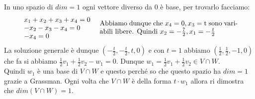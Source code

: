 \begin{example}
In uno spazio di $dim = 1$ ogni vettore diverso da 0 è base, per trovarlo facciamo:\\
\[\begin{array}{l}
    x_1 + x_2 + x_3 + x_4 = 0\\
    -x_2 - x_3 - x_4 = 0\\
    -x_4 = 0
\end{array}
\hspace{.3cm}
\parbox{7cm}{Abbiamo dunque che $x_4 = 0, x_3$ = t sono variabili libere. Quindi $x_2 = -\frac{7}{2}, x_1 = -\frac{t}{2}$}
\]
La soluzione generale è dunque $(-\frac{t}{2}, -\frac{t}{2}, t, 0)$ e con $t=1$ abbiamo $(\frac{1}{2}, \frac{1}{2}, -1, 0)$ che fa si abbiamo $\frac{1}{2}v_1 + \frac{1}{2}v_2 - w_1 = 0$. Dunque $w_1 = \frac{1}{2}v_1 + \frac{1}{2}v_2 \in V \cap W$.\\
Quindi $w_1$ è una base di $V \cap W$ e questo perché so che questo spazio ha $dim = 1$ grazie a Grassman. Ogni volta che $V \cap W$ è della forma $t \cdot w_1$ allora ri dimostra che $dim(V \cap W) = 1$.
\end{example}
